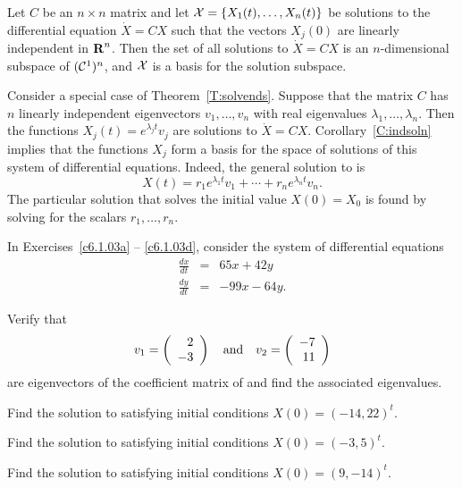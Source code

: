 \begin{cor}  \label{C:indsoln}
Let $C$ be an $n\times n$ matrix and let ${\cal X}=\{X_1(t),\ldots,X_n(t)\}$
be solutions to the differential equation $\dot{X}=CX$ such that the vectors
$X_j(0)$ are linearly independent in $\mbox{$\bf{R}$}^n$.  Then the set of all solutions
to $\dot{X}=CX$ is an $n$-dimensional subspace of $({\cal C}^1)^n$, and
${\cal X}$ is a basis for the solution subspace.
\end{cor}

Consider a special case of Theorem~\ref{T:solvends}.  Suppose that the
matrix $C$ has $n$ linearly independent eigenvectors $v_1,\ldots,v_n$ with
real eigenvalues $\lambda_1,\ldots,\lambda_n$.  Then the functions
$X_j(t)=e^{\lambda_j t}v_j$ are solutions to $\dot{X}=CX$.
Corollary~\ref{C:indsoln} implies that the functions $X_j$ form a basis for
the space of solutions of this system of differential equations.  Indeed,
the general solution to  is
\begin{equation}  \label{e:gensoln}
X(t) = r_1e^{\lambda_1 t}v_1 + \cdots + r_ne^{\lambda_n t}v_n.
\end{equation}
The particular solution that solves the initial value $X(0)=X_0$ is found by
solving  for the scalars $r_1,\ldots,r_n$.





\EXER

\TEXER

\noindent In Exercises~\ref{c6.1.03a} -- \ref{c6.1.03d}, consider the system of
differential equations
\begin{equation} \label{Ex.1.03}
\begin{array}{rcr}
\frac{dx}{dt}  & = & 65x+42y \\
\frac{dy}{dt}  & = & -99x-64y.
\end{array}
\end{equation}
\begin{exercise} \label{c6.1.03a}
Verify that
\[
v_1 = \left(\begin{array}{r} 2 \\ -3\end{array}\right) \quad\mbox{and}\quad v_2 = \left(\begin{array}{r} -7 \\ 11\end{array}\right)
\]
are eigenvectors of the coefficient matrix of  and find
the associated eigenvalues.
\end{exercise}
\begin{exercise} \label{c6.1.03b}
Find the solution to  satisfying initial conditions $X(0) =
(-14,22)^t$.
\end{exercise}
\begin{exercise} \label{c6.1.03c}
Find the solution to  satisfying initial conditions $X(0) =
(-3,5)^t$.
\end{exercise}
\begin{exercise} \label{c6.1.03d}
Find the solution to  satisfying initial conditions $X(0) =
(9,-14)^t$.
\end{exercise}


